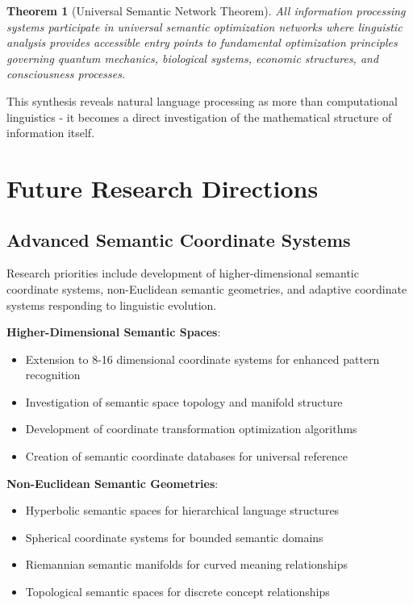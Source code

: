\documentclass[12pt,a4paper]{article}
\newtheorem{theorem}{Theorem}
\begin{document}
\begin{table}[H]
\begin{theorem}[Universal Semantic Network Theorem]
All information processing systems participate in universal semantic optimization networks where linguistic analysis provides accessible entry points to fundamental optimization principles governing quantum mechanics, biological systems, economic structures, and consciousness processes.
\end{theorem}

This synthesis reveals natural language processing as more than computational linguistics - it becomes a direct investigation of the mathematical structure of information itself.

\section{Future Research Directions}

\subsection{Advanced Semantic Coordinate Systems}

Research priorities include development of higher-dimensional semantic coordinate systems, non-Euclidean semantic geometries, and adaptive coordinate systems responding to linguistic evolution.

\textbf{Higher-Dimensional Semantic Spaces}:
\begin{itemize}
\item Extension to 8-16 dimensional coordinate systems for enhanced pattern recognition
\item Investigation of semantic space topology and manifold structure  
\item Development of coordinate transformation optimization algorithms
\item Creation of semantic coordinate databases for universal reference
\end{itemize}

\textbf{Non-Euclidean Semantic Geometries}:
\begin{itemize}
\item Hyperbolic semantic spaces for hierarchical language structures
\item Spherical coordinate systems for bounded semantic domains
\item Riemannian semantic manifolds for curved meaning relationships
\item Topological semantic spaces for discrete concept relationships
\end{itemize}


\end{table}
\end{document}
